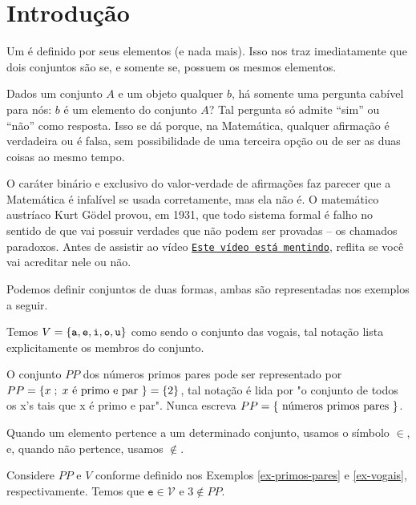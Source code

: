 \section{Introdução}
\label{section:intro}
Um  é definido por seus elementos (e nada mais). Isso nos traz imediatamente que dois conjuntos são  se, e somente se, possuem os mesmos elementos.

Dados um conjunto $A$ e um objeto qualquer $b$, há somente uma pergunta cabível para nós: $b$ é um elemento do conjunto $A$? Tal pergunta só admite ``sim'' ou ``não'' como resposta. Isso se dá porque, na Matemática, qualquer afirmação é verdadeira ou é falsa, sem possibilidade de uma terceira opção ou de ser as duas coisas ao mesmo tempo. 

O caráter binário e exclusivo do valor-verdade de afirmações faz parecer que a Matemática é infalível se usada corretamente, mas ela não é. O matemático austríaco Kurt Gödel provou, em 1931, que todo sistema formal é falho no sentido de que vai possuir verdades que não podem ser provadas -- os chamados paradoxos. Antes de assistir ao vídeo \href{https://youtu.be/UI1xR_AECrU}{{\tt Este vídeo está mentindo}}, reflita se você vai acreditar nele ou não.

\begin{remark}
Podemos definir conjuntos de duas formas, ambas são representadas nos exemplos a seguir.
\end{remark}

\begin{example}
\label{ex-vogais}
Temos $V=\left\{\texttt{a}, \texttt{e}, \texttt{i}, \texttt{o}, \texttt{u}\right\}$ como sendo o conjunto das vogais, tal notação lista explicitamente os membros do conjunto.
\end{example}

\begin{example}
\label{ex-primos-pares}
O conjunto $PP$ dos números primos pares pode ser representado por $PP = \left\{x \;;\; x \text{ é primo e par }\right\} = \left\{2\right\}$, tal notação é lida por "o conjunto de todos os x's tais que x é primo e par". Nunca escreva $PP = \left\{\text{ números primos pares }\right\}$.
\end{example}

\begin{remark}
Quando um elemento pertence a um determinado conjunto, usamos o símbolo $\in$, e, quando não pertence, usamos $\notin$.
\end{remark}

\begin{example}
Considere $PP$ e $V$ conforme definido nos Exemplos \ref{ex-primos-pares} e \ref{ex-vogais}, respectivamente. Temos que $\texttt{e} \in \mathcal{V}$ e $3 \notin PP$.
\end{example}

